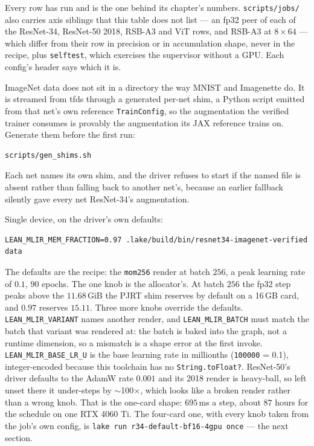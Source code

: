 \noindent Every row has run and is the one behind its chapter's numbers.
\texttt{scripts/jobs/} also carries axis siblings that this table does not
list --- an fp32 peer of each of the ResNet-34, ResNet-50 2018, RSB-A3 and
ViT rows, and RSB-A3 at $8\times64$ --- which differ from their row in
precision or in accumulation shape, never in the recipe, plus
\texttt{selftest}, which exercises the supervisor without a GPU. Each
config's header says which it is.


ImageNet data does not sit in a directory the way MNIST and Imagenette do. It
is streamed from tfds through a generated per-net shim, a Python
script emitted from that net's own reference \texttt{TrainConfig}, so the
augmentation the verified trainer consumes is provably the augmentation its
JAX reference trains on. Generate them before the first run:

\begin{verbatim}
scripts/gen_shims.sh
\end{verbatim}

Each net names its own shim, and the driver refuses to start if the named file
is absent rather than falling back to another net's, because an earlier
fallback silently gave every net ResNet-34's augmentation.


Single device, on the driver's own defaults:

\begin{verbatim}
LEAN_MLIR_MEM_FRACTION=0.97 .lake/build/bin/resnet34-imagenet-verified data
\end{verbatim}

The defaults are the recipe: the \texttt{mom256} render at batch $256$, a
peak learning rate of $0.1$, $90$ epochs. The one knob is the allocator's.
At batch $256$ the fp32 step peaks above the $11.68$\,GiB the PJRT shim
reserves by default on a 16\,GB card, and $0.97$ reserves $15.11$. Three
more knobs override the defaults. \texttt{LEAN\_MLIR\_VARIANT} names another
render, and \texttt{LEAN\_MLIR\_BATCH} must match the batch that variant was
rendered at: the batch is baked into the graph, not a runtime dimension, so
a mismatch is a shape error at the first invoke.
\texttt{LEAN\_MLIR\_BASE\_LR\_U} is the base learning rate in millionths
(\texttt{100000} = 0.1), integer-encoded because this toolchain has no
\texttt{String.toFloat?}. ResNet-50's driver defaults to the AdamW rate
$0.001$ and its 2018 render is heavy-ball, so left unset there it
under-steps by $\sim$100$\times$, which looks like a broken render rather
than a wrong knob. That is the one-card shape: $695$\,ms a step, about $87$
hours for the schedule on one RTX 4060 Ti. The four-card one, with every
knob taken from the job's own config, is \texttt{lake run
r34-default-bf16-4gpu once} --- the next section.

